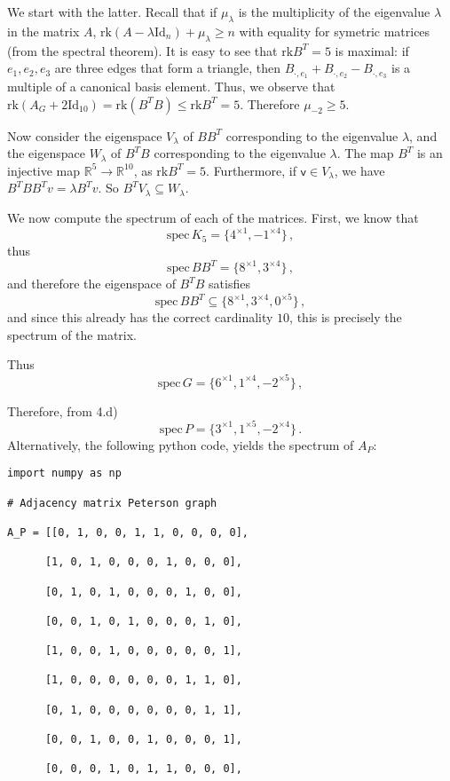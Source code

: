 \documentclass[kulak]{tplt}
\theoremstyle{definition}
\newcommand{\R}{\mathbb{R}}
\newcommand{\vv}{\mathsf{v}}
\newcommand{\rk}{\mathrm{rk}}
\newcommand{\Id}{\mathrm{Id}}
\newcommand{\spec}{\mathrm{spec}}
\begin{document}
\begin{enumerate}
We start with the latter.
Recall that if $\mu_{\lambda}$ is the multiplicity of the eigenvalue $\lambda $ in the matrix $A$, $\rk(A -\lambda  \Id_n ) + \mu_{\lambda} \geq n$ with equality for symetric matrices (from the spectral theorem).
It is easy to see that $\rk B^T = 5 $ is maximal: if $e_1, e_2, e_3$ are three edges that form a triangle, then $B_{\cdot, e_1} + B_{\cdot, e_2} - B_{\cdot, e_3}$ is a multiple of a canonical basis element.
Thus, we observe that $\rk(A_G + 2 \Id_{10} ) = \rk (B^T B) \leq \rk B^T = 5$.
Therefore $\mu_{-2} \geq 5$.

Now consider the eigenspace $V_{\lambda} $ of $B B^T$ corresponding to the eigenvalue $\lambda$, and the eigenspace $W_{\lambda} $ of $B^T B$ corresponding to the eigenvalue $\lambda$.
The map $B^T$ is an injective map $\R^5 \to \R^{10}$, as $\rk B^T = 5$.
Furthermore, if $\vv \in V_{\lambda} $, we have $B^T B B^T v = \lambda B^T v$.
So $B^T V_{\lambda} \subseteq W_{\lambda}$.


We now compute the spectrum of each of the matrices.
First, we know that 
$$\spec \, K_5 = \{4^{\times 1 }, -1^ {\times 4} \}\, ,$$
thus
$$\spec \, B B^T = \{8^{\times 1 }, 3^{\times 4} \}\, ,$$
and therefore the eigenspace of $B^T B$ satisfies
$$\spec \, B B^T \subseteq \{8^{\times 1 }, 3^{\times 4}, 0^{\times 5} \}\, ,$$
and since this already has the correct cardinality $10$, this is precisely the spectrum of the matrix.

Thus
$$\spec \, G = \{6^{\times 1 }, 1^{\times 4}, -2^ {\times 5} \}\, ,$$

Therefore, from 4.d)
$$\spec \, P = \{3^{\times 1}, 1^{\times 5}, -2^{\times 4} \}\, .$$
Alternatively, the following python code, yields the spectrum of $A_P$:
\begin{verbatim}
import numpy as np

# Adjacency matrix Peterson graph

A_P = [[0, 1, 0, 0, 1, 1, 0, 0, 0, 0],

      [1, 0, 1, 0, 0, 0, 1, 0, 0, 0],

      [0, 1, 0, 1, 0, 0, 0, 1, 0, 0],

      [0, 0, 1, 0, 1, 0, 0, 0, 1, 0],

      [1, 0, 0, 1, 0, 0, 0, 0, 0, 1],

      [1, 0, 0, 0, 0, 0, 0, 1, 1, 0],

      [0, 1, 0, 0, 0, 0, 0, 0, 1, 1],

      [0, 0, 1, 0, 0, 1, 0, 0, 0, 1],

      [0, 0, 0, 1, 0, 1, 1, 0, 0, 0],


\end{verbatim}
\end{enumerate}
\end{document}
